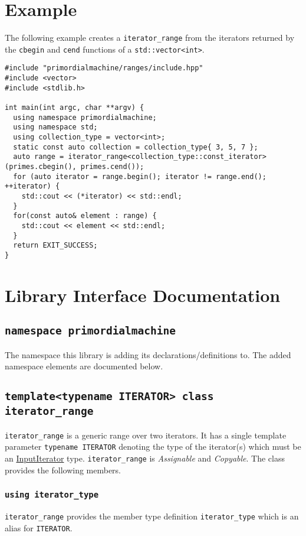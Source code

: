 \documentclass[oneside]{article}
\begin{document}
\section{Example}
The following example creates a \verb+iterator_range+ from the iterators returned by the
\verb+cbegin+ and \verb+cend+ functions of a \verb+std::vector<int>+.
\begin{verbatim}
#include "primordialmachine/ranges/include.hpp"
#include <vector>
#include <stdlib.h>

int main(int argc, char **argv) {
  using namespace primordialmachine;
  using namespace std;
  using collection_type = vector<int>;
  static const auto collection = collection_type{ 3, 5, 7 };
  auto range = iterator_range<collection_type::const_iterator>(primes.cbegin(), primes.cend());
  for (auto iterator = range.begin(); iterator != range.end(); ++iterator) {
    std::cout << (*iterator) << std::endl;
  }
  for(const auto& element : range) {
    std::cout << element << std::endl;
  }
  return EXIT_SUCCESS;
}
\end{verbatim}


\section{Library Interface Documentation}

\subsection{\texttt{namespace primordialmachine}}
The namespace this library is adding its declarations/definitions to.
The added namespace elements are documented below.

\subsection{\texttt{template<typename ITERATOR> class iterator\_range}}
\texttt{iterator\_range} is a generic range over two iterators.
It has a single template parameter \texttt{typename ITERATOR} denoting the type of the     iterator(s)
which must be an \href{https://en.cppreference.com/w/cpp/named_req/InputIterator}{InputIterator} type.
\texttt{iterator\_range} is \textit{Assignable} and \textit{Copyable}. The class provides         the
following members.

\subsubsection{\texttt{using iterator\_type}}
\texttt{iterator\_range} provides the member type definition \texttt{iterator\_type} which is an alias
for \texttt{ITERATOR}.
\end{document}
